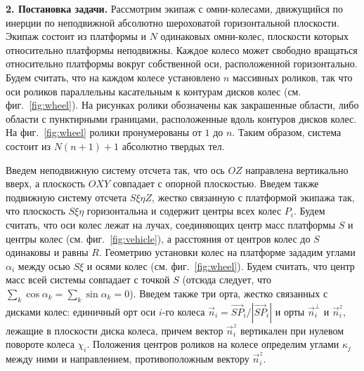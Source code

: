 {\bf 2. Постановка задачи.}
Рассмотрим экипаж с омни-колесами, движущийся по инерции по неподвижной абсолютно шероховатой горизонтальной плоскости. Экипаж состоит из платформы и $N$ одинаковых омни-колес, плоскости которых относительно платформы неподвижны. Каждое колесо может свободно вращаться относительно платформы вокруг собственной оси, расположенной горизонтально. Будем считать, что на каждом колесе установлено $n$ массивных роликов, так что оси роликов параллельны 
касательным к контурам дисков колес (см. фиг.~\ref{fig:wheel}). На рисунках ролики обозначены как закрашенные области, либо области с пунктирными границами, расположенные вдоль контуров дисков колес. На фиг.~\ref{fig:wheel} ролики пронумерованы от $1$ до $n$.
Таким образом, система состоит из $N(n+1) + 1$ абсолютно твердых тел. 



Введем неподвижную систему отсчета так, что ось $OZ$ направлена вертикально вверх, а плоскость $OXY$ совпадает с опорной плоскостью.
Введем также подвижную систему отсчета $S\xi\eta Z$, жестко связанную с платформой экипажа так, что плоскость $S\xi\eta$ 
горизонтальна и содержит центры всех колес $P_i$. Будем считать, 
что оси колес лежат на лучах, соединяющих центр масс платформы $S$ и центры колес (см. фиг.~\ref{fig:vehicle}), а расстояния от 
центров колес до $S$ одинаковы и равны $R$. Геометрию установки колес на платформе зададим углами $\alpha_i$ между осью $S\xi$ и осями колес 
(см. фиг.~\ref{fig:wheel}). Будем считать, что центр масс всей системы совпадает с точкой $S$ (отсюда следует, что $\sum\limits_{k} \cos\alpha_k = \sum\limits_{k}\sin\alpha_k = 0$). Введем также три орта, жестко связанных с дисками колес: единичный орт оси $i$-го колеса $\vec{n}_i = \vec{SP}_i/|\vec{SP}_i|$ и орты $\vec{n}_i^\perp$ и $\vec{n}_i^z$, лежащие в плоскости диска колеса, причем вектор $\vec{n}_i^z$ вертикален при нулевом повороте колеса $\chi_i$. Положения центров роликов на колесе определим углами $\kappa_j$ между ними и направлением, противоположным вектору $\vec{n}_i^z$. 

